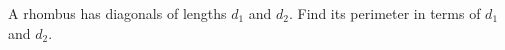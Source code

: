 A rhombus has diagonals of lengths $d_1$ and $d_2$. Find its perimeter in terms of $d_1$ and $d_2$.
